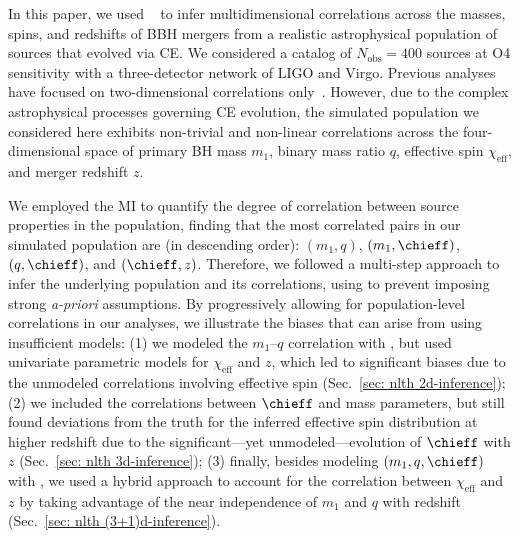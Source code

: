 \begin{refsection}
In this paper, we used \PixelPop~\citep{Heinzel:2024jlc, Heinzel:2024hva} to infer multidimensional correlations across the masses, spins, and redshifts of \ac{BBH} mergers from a
realistic astrophysical population of sources that evolved via \ac{CE}. We considered a catalog of $N_\mathrm{obs}=400$ sources at \ac{O4} sensitivity with a three-detector network of LIGO and Virgo. Previous \PixelPop analyses have focused on two-dimensional correlations only~\citep{Heinzel:2024hva,Heinzel:2024jlc}. However, due to the complex astrophysical processes governing \ac{CE} evolution, the simulated population we considered here exhibits non-trivial and non-linear correlations across the four-dimensional space of primary \ac{BH} mass $m_1$, binary mass ratio $q$, effective spin $\chi_\mathrm{eff}$, and merger redshift $z$.

We employed the \acf{MI} to quantify the degree of correlation between source properties in the population, finding that the most correlated pairs in our simulated population are (in descending order): $(m_1,q)$, $(m_1,\chieff)$, $(q,\chieff)$, and $(\chieff,z)$.
Therefore, we followed a multi-step approach to infer the underlying population and its correlations, using \PixelPop to prevent imposing strong \textit{a-priori} assumptions. By progressively allowing for population-level correlations in our analyses, we illustrate the biases that can arise from using insufficient models: (1) we modeled the $m_1$--$q$ correlation with \PixelPop, but used univariate parametric models for $\chi_\mathrm{eff}$ and $z$, which led to significant biases due to the unmodeled correlations involving effective spin (Sec.~\ref{sec: nlth 2d-inference}); (2) we included the correlations between $\chieff$ and mass parameters, but still found deviations from the truth for the inferred effective spin distribution at higher redshift due to the significant---yet unmodeled---evolution of $\chieff$ with $z$ (Sec.~\ref{sec: nlth 3d-inference}); (3) finally, besides modeling $(m_1,q,\chieff)$ with \PixelPop, we used a hybrid approach to account for the correlation between $\chi_\mathrm{eff}$ and $z$ by taking advantage of the near independence of $m_1$ and $q$ with redshift (Sec.~\ref{sec: nlth (3+1)d-inference}). 


\end{refsection}
